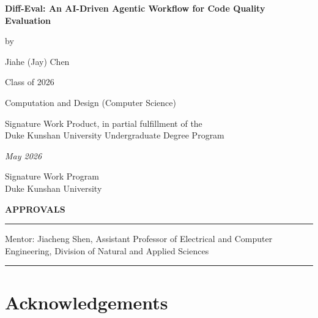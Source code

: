 \documentclass[12pt,a4paper,oneside]{report}
\newcommand{\authorname}{Jiahe (Jay) Chen}
\newcommand{\thetitle}{Diff-Eval: An AI-Driven Agentic Workflow for Code Quality Evaluation}
\newcommand{\submissiondate}{May 2026}
\newcommand{\mentor}{Jiacheng Shen}
\newcommand{\academicunit}{Division of Natural and Applied Sciences}
\newcommand{\mentortitle}{Assistant Professor of Electrical and Computer Engineering}
\begin{document}
\begin{titlepage}

\vspace*{\bigskipamount}

\begin{center}
{\sffamily\LARGE\bfseries\MakeUppercase\thetitle\par}

\bigskip

by

\bigskip

{\Large \authorname}

\bigskip

Class of 2026

Computation and Design (Computer Science)

\bigskip

Signature Work Product, in partial fulfillment of the \\
Duke Kunshan University Undergraduate Degree Program

\bigskip

\emph{\submissiondate}

\bigskip

Signature Work Program \\
Duke Kunshan University

\end{center}

\vfill

\textbf{\textsf{APPROVALS}}

\bigskip\bigskip\bigskip
\hrule

Mentor: \mentor, \mentortitle, \academicunit

\bigskip\bigskip\bigskip
\hrule

\end{titlepage}

\clearpage
{}

\setcounter{tocdepth}{1}
\tableofcontents

\chapter*{Acknowledgements}
\label{acknowledgements}
\end{document}
